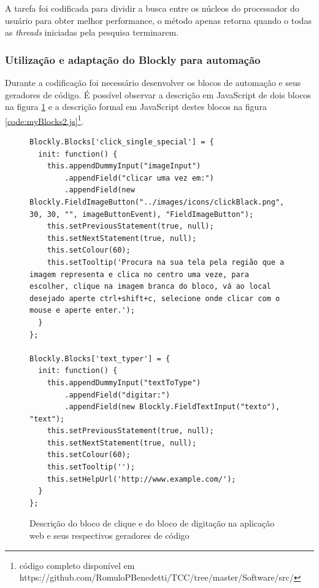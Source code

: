 \documentclass[tg]{mdtufsm}
\begin{document}
                    A tarefa foi codificada para dividir a busca entre os núcleos do processador do usuário para obter melhor performance, o método apenas retorna quando o todas as \emph{threads} iniciadas pela pesquisa terminarem.

                \subsubsection {Utilização e adaptação do Blockly para automação}

                    Durante a codificação foi necessário desenvolver os blocos de automação e seus geradores de código. É possível observar a descrição em JavaScript de dois blocos na figura \ref{code:myBlocks1.js} e a descrição formal em JavaScript destes blocos na figura \ref{code:myBlocks2.js}\footnote{\label{note1}código completo disponível em https://github.com/RomuloPBenedetti/TCC/tree/master/Software/src/}.


\begin{figure}[!htb]
\begin{lstlisting}
Blockly.Blocks['click_single_special'] = {
  init: function() {
    this.appendDummyInput("imageInput")
        .appendField("clicar uma vez em:")
        .appendField(new Blockly.FieldImageButton("../images/icons/clickBlack.png", 30, 30, "", imageButtonEvent), "FieldImageButton");
    this.setPreviousStatement(true, null);
    this.setNextStatement(true, null);
    this.setColour(60);
    this.setTooltip('Procura na sua tela pela região que a imagem representa e clica no centro uma veze, para escolher, clique na imagem branca do bloco, vá ao local desejado aperte ctrl+shift+c, selecione onde clicar com o mouse e aperte enter.');
  }
};

Blockly.Blocks['text_typer'] = {
  init: function() {
    this.appendDummyInput("textToType")
        .appendField("digitar:")
        .appendField(new Blockly.FieldTextInput("texto"), "text");
    this.setPreviousStatement(true, null);
    this.setNextStatement(true, null);
    this.setColour(60);
    this.setTooltip('');
    this.setHelpUrl('http://www.example.com/');
  }
};
\end{lstlisting}
    \caption{Descrição do bloco de clique e do bloco de digitação na aplicação web e seus respectivos geradores de código}
    \label{code:myBlocks1.js}
\end{figure}
\end{document}
